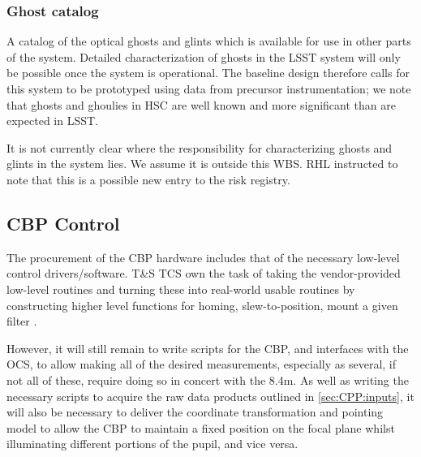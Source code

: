 \subsubsection{Ghost catalog}\label{sec:CPP:output:GhostCatalog}
A catalog of the optical ghosts and glints which is available for use in other parts of the system. Detailed characterization of ghosts in the LSST system will only be possible once the system is operational. The baseline design therefore calls for this system to be prototyped using data from precursor instrumentation; we note that ghosts and ghoulies in \eg HSC are well known and more significant than are expected in LSST.
\begin{note}
It is not currently clear where the responsibility for characterizing ghosts and glints in the system lies. We assume it is outside this WBS. RHL instructed to note that this is a possible new entry to the risk registry.
\end{note}





\subsection{CBP Control}\label{sec:CPP:CBP_control}
The procurement of the CBP hardware includes that of the necessary low-level control drivers/software. T\&S TCS own the task of taking the vendor-provided low-level routines and turning these into real-world usable routines by constructing higher level functions for \eg homing, slew-to-position, mount a given filter \etc. 

However, it will still remain to write scripts for the CBP, and interfaces with the OCS, to allow making all of the desired measurements, especially as several, if not all of these, require doing so in concert with the 8.4m.
\alg As well as writing the necessary scripts to acquire the raw data products outlined in \secsymbol\ref{sec:CPP:inputs}, it will also be necessary to deliver the coordinate transformation and pointing model to allow the CBP to maintain a fixed position on the focal plane whilst illuminating different portions of the pupil, and vice versa.
















